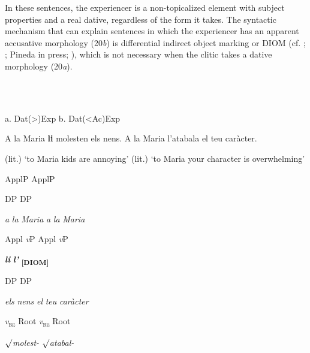 \documentclass[output=paper,modfonts,nonflat]{langsci/langscibook}
\begin{document}
In these sentences, the experiencer is a non-topicalized element with subject properties and a real dative, regardless of the form it takes. The syntactic mechanism that can explain sentences in which the experiencer has an apparent accusative morphology (20\textit{b}) is differential indirect object marking or DIOM (cf. \citealt{Bilous2011}; \citealt{Pineda2016}; Pineda in press; \citealt{PinedaRoyo2017}), which is not necessary when the clitic takes a dative morphology (20\textit{a}).

\ea%
    \label{ex:key:20}
    \gll\\
        \\
    \glt
    \z

         a. Dat(>)Exp                                     b. Dat(<Ac)Exp

           A la Maria \textbf{li} molesten els nens.       A la Maria l’atabala el teu caràcter.

  (lit.) ‘to Maria kids are annoying’    (lit.) ‘to Maria your character is overwhelming’

ApplP          ApplP

   DP             DP

\textit{a} \textit{la} \textit{Maria}        \textit{a} \textit{la} \textit{Maria}

Appl     \textit{v}P      Appl     \textit{v}P

     \textbf{\textit{li}}            \textbf{\textit{l’}} \textbf{\textsubscript{[DIOM]}}

     DP           DP

          \textit{els} \textit{nens}            \textit{el} \textit{teu} \textit{caràcter}

      \textit{v}\textsc{\textsubscript{be}}           Root       \textit{v}\textsc{\textsubscript{be}}           Root

      ${\surd}$\textit{molest-}              ${\surd}$\textit{atabal-}
\end{document}
